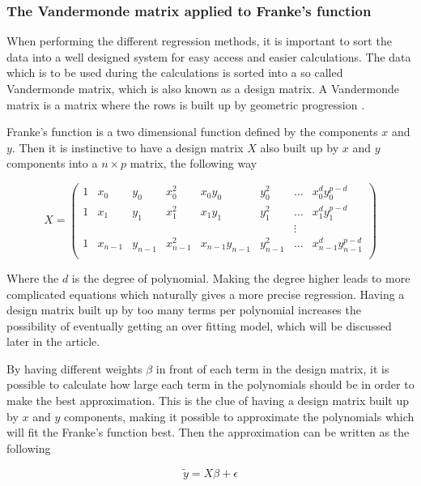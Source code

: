 \subsubsection{The Vandermonde matrix applied to Franke's function}


When performing the different regression methods, it is important to sort the data into a well designed system for easy access and easier calculations. The data which is to be used during the calculations is sorted into a so called Vandermonde matrix, which is also known as a design matrix. A Vandermonde matrix is a matrix where the rows is built up by geometric progression \cite{vandermonde}.

Franke's function is a two dimensional function defined by the components $x$ and $y$. Then it is instinctive to have a design matrix $X$ also built up by $x$ and $y$ components into a $n\times p$ matrix, the following way

\begin{equation*}
X=  \begin{pmatrix}
   1& x_0 & y_0 & x_0^2 & x_0y_0 & y_0^2 & \ldots & x_0^d y_0^{p-d}\\
    1& x_1 & y_1 & x_1^2 & x_1y_1 & y_1^2 & \ldots & x_1^d y_1^{p-d}\\
    & &  &  &  &  & \vdots & \\
    1 & x_{n-1} & y_{n-1} & x_{n-1}^2 & x_{n-1}y_{n-1} & y_{n-1}^2 & \ldots & x_{n-1}^d y_{n-1}^{p-d}\\
 \end{pmatrix}
\end{equation*}

Where the $d$ is the degree of polynomial. Making the degree higher leads to more complicated equations which naturally gives a more precise regression. Having a design matrix built up by too many terms per polynomial increases the possibility of eventually getting an over fitting model, which will be discussed later in the article.

By having different weights $\beta$ in front of each term in the design matrix, it is possible to calculate how large each term in the polynomials should be in order to make the best approximation. This is the clue of having a design matrix built up by $x$ and $y$ components, making it possible to approximate the polynomials which will fit the Franke's function best. Then the approximation can be written as the following

\begin{equation}
    \tilde{y}=X\beta+\epsilon
\end{equation}

